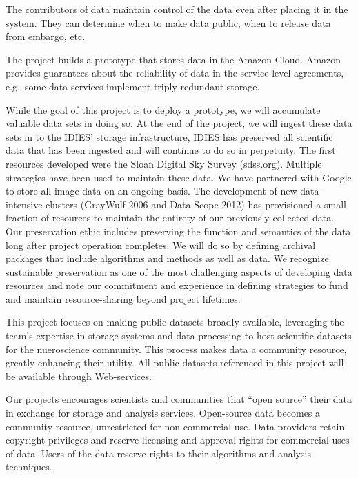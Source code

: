   The contributors of data maintain control of the data even after placing it in the system.
  They can determine when to make data public, when to release data from embargo, etc.

 The project builds a prototype that stores 
data in the Amazon Cloud.  Amazon provides guarantees about the reliability of data
in the service level agreements, e.g.~some data services implement triply redundant storage. 

  While the goal of this project is to deploy a 
prototype, we will accumulate valuable data sets in doing so.  At the end of the project,
we will ingest these data sets in to the IDIES' storage infrastructure,
IDIES has preserved all scientific data that has 
  been ingested and will continue to do so in perpetuity. 
  The first resources developed were the Sloan Digital Sky Survey (sdss.org). 
  Multiple strategies have been used to maintain these data. We 
  have partnered with Google to store all image data on an ongoing basis. The development of 
  new data-intensive clusters (GrayWulf 2006 and Data-Scope 2012) has provisioned a small 
  fraction of resources to maintain the entirety of our previously collected data. Our preservation 
  ethic includes preserving the function and semantics of the data long after project operation 
  completes. We will do so by defining archival packages that include algorithms and methods as 
  well as data. We recognize sustainable preservation as one of the most challenging aspects of 
  developing data resources and note our commitment and experience in defining strategies to 
  fund and maintain resource-sharing beyond project lifetimes. 

 This project focuses on making public datasets broadly 
available, leveraging the team’s expertise in storage systems and data 
processing to host scientific datasets for the nueroscience community.
This process makes data a community resource, greatly enhancing their 
utility. All public datasets referenced in this project will be available through Web-services. 

 Our projects encourages scientists and communities 
that ``open source'' their data in exchange for storage and analysis services. Open-source data 
becomes a community resource, unrestricted for non-commercial use. Data providers retain 
copyright privileges and reserve licensing and approval rights for commercial uses of data. 
Users of the data reserve rights to their algorithms and analysis techniques.

